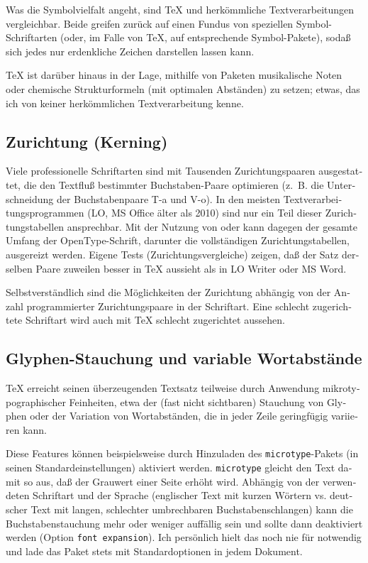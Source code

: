 \documentclass[11pt,a4paper,ngerman,french,DIV=8]{scrartcl}
\begin{document}
\begin{otherlanguage}{ngerman}
Was die Symbolvielfalt angeht, sind \TeX{} und herkömmliche Textverarbeitungen vergleichbar. Beide greifen zurück auf einen Fundus von speziellen Symbol-Schriftarten (oder, im Falle von \TeX{}, auf entsprechende Symbol-Pakete), sodaß sich jedes nur erdenkliche Zeichen darstellen lassen kann.

\TeX{} ist darüber hinaus in der Lage, mithilfe von Paketen musikalische Noten oder chemische Strukturformeln (mit optimalen Abständen) zu setzen; etwas, das ich von keiner herkömmlichen Textverarbeitung kenne.

\subsection{Zurichtung (Kerning)}

Viele professionelle Schriftarten sind mit Tausenden Zurichtungspaaren ausgestattet, die den Textfluß bestimmter Buchstaben-Paare optimieren (z.~B. die Unterschneidung der Buchstabenpaare T-a und V-o). In den meisten Textverarbeitungsprogrammen (LO, MS Office älter als 2010) sind nur ein Teil dieser Zurichtungstabellen ansprechbar. Mit der Nutzung von \XeTeX{} oder \LuaTeX{} kann dagegen der gesamte Umfang der OpenType-Schrift, darunter die vollständigen Zurichtungstabellen, ausgereizt werden. Eigene Tests (Zurichtungsvergleiche) zeigen, daß der Satz derselben Paare zuweilen besser in \TeX{} aussieht als in LO Writer oder MS Word.

Selbstverständlich sind die Möglichkeiten der Zurichtung abhängig von der Anzahl programmierter Zurichtungspaare in der Schriftart. Eine schlecht zugerichtete Schriftart wird auch mit \TeX{} schlecht zugerichtet aussehen.

\subsection{Glyphen-Stauchung und variable Wortabstände}

\TeX{} erreicht seinen überzeugenden Textsatz teilweise durch Anwendung mikrotypographischer Feinheiten, etwa der (fast nicht sichtbaren) Stauchung von Glyphen oder der Variation von Wortabständen, die in jeder Zeile geringfügig variieren kann.

Diese Features können beispielsweise durch Hinzuladen des \texttt{microtype}-Pakets (in seinen Standardeinstellungen) aktiviert werden. \texttt{microtype} gleicht den Text damit so aus, daß der Grauwert einer Seite erhöht wird. Abhängig von der verwendeten Schriftart und der Sprache (englischer Text mit kurzen Wörtern vs. deutscher Text mit langen, schlechter umbrechbaren Buchstabenschlangen) kann die Buchstabenstauchung mehr oder weniger auffällig sein und sollte dann deaktiviert werden (Option \texttt{font expansion}). Ich persönlich hielt das noch nie für notwendig und lade das Paket stets mit Standardoptionen in jedem Dokument.


\end{otherlanguage}
\end{document}
